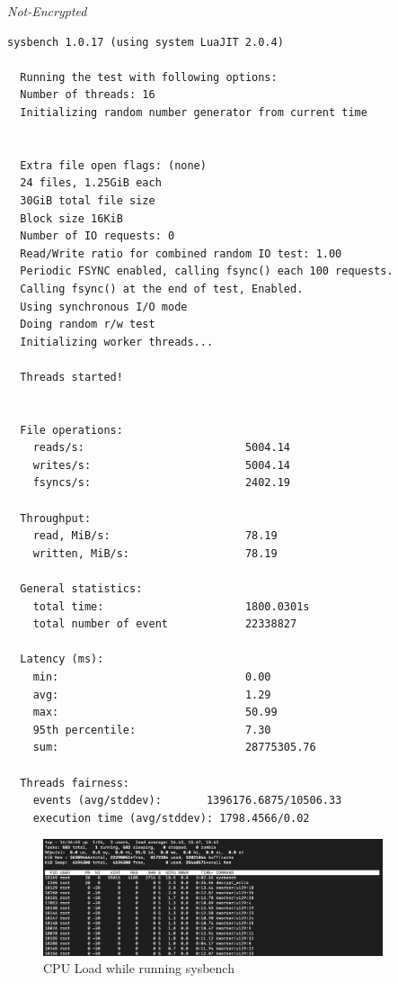 \noindent\begin{minipage}[t]{0.45\linewidth}
  \centering
  \textit{Not-Encrypted}
  \begin{lstlisting}[basicstyle=\tiny,frame=single, label=cpu_test2]
  sysbench 1.0.17 (using system LuaJIT 2.0.4)

  Running the test with following options:
  Number of threads: 16
  Initializing random number generator from current time
  
  
  Extra file open flags: (none)
  24 files, 1.25GiB each
  30GiB total file size
  Block size 16KiB
  Number of IO requests: 0
  Read/Write ratio for combined random IO test: 1.00
  Periodic FSYNC enabled, calling fsync() each 100 requests.
  Calling fsync() at the end of test, Enabled.
  Using synchronous I/O mode
  Doing random r/w test
  Initializing worker threads...
  
  Threads started!
  
  
  File operations:
    reads/s:                         5004.14
    writes/s:                        5004.14
    fsyncs/s:                        2402.19
  
  Throughput:
    read, MiB/s:                     78.19
    written, MiB/s:                  78.19
  
  General statistics:
    total time:                      1800.0301s
    total number of event            22338827
  
  Latency (ms):
    min:                             0.00
    avg:                             1.29
    max:                             50.99
    95th percentile:                 7.30
    sum:                             28775305.76
  
  Threads fairness:
    events (avg/stddev):       1396176.6875/10506.33
    execution time (avg/stddev): 1798.4566/0.02
  \end{lstlisting}
\end{minipage}
\begin{figure}
  \includegraphics[width=10cm]{images/image6.png}
  \centering
  \caption{CPU Load while running sysbench}
\end{figure}

